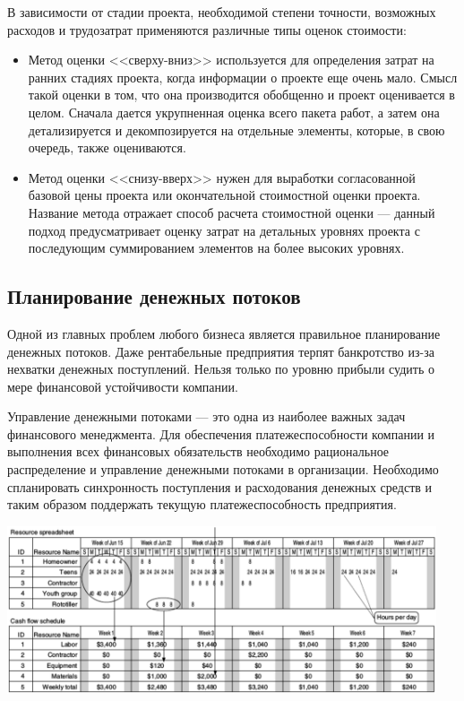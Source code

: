 \documentclass{../../text-style}
\begin{document}
В зависимости от стадии проекта, необходимой степени точности, возможных расходов и трудозатрат применяются различные типы оценок стоимости:
\begin{itemize}
    \item Метод оценки <<сверху-вниз>> используется для определения затрат на ранних стадиях проекта, когда информации о проекте еще очень мало. Смысл такой оценки в том, что она производится обобщенно и проект оценивается в целом. Сначала дается укрупненная оценка всего пакета работ, а затем она детализируется и декомпозируется на отдельные элементы, которые, в свою очередь, также оцениваются.
    \item Метод оценки <<снизу-вверх>> нужен для выработки согласованной базовой цены проекта или окончательной стоимостной оценки проекта. Название метода отражает способ расчета стоимостной оценки --- данный подход предусматривает оценку затрат на детальных уровнях проекта с последующим суммированием элементов на более высоких уровнях.
\end{itemize}

\subsection{Планирование денежных потоков}

Одной из главных проблем любого бизнеса является правильное планирование денежных потоков. Даже рентабельные предприятия терпят банкротство из-за нехватки денежных поступлений. Нельзя только по уровню прибыли судить о мере финансовой устойчивости компании.

Управление денежными потоками --- это одна из наиболее важных задач финансового менеджмента. Для обеспечения платежеспособности компании и выполнения всех финансовых обязательств необходимо рациональное распределение и управление денежными потоками в организации. Необходимо спланировать синхронность поступления и расходования денежных средств и таким образом поддержать текущую платежеспособность предприятия.

\begin{center}
    \includegraphics[width=0.95\textwidth]{cashFlow.png}
\end{center}
\end{document}
